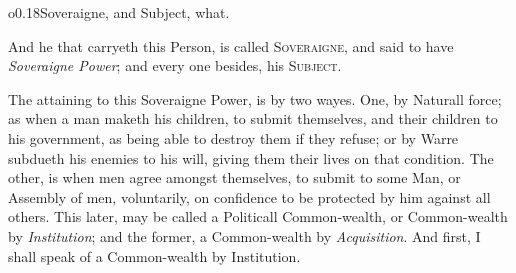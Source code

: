 \begin{wrapfigure}[4]{o}{0.18\textwidth}\wrapadj Soveraigne, and
Subject, what. \end{wrapfigure}

And he that carryeth this Person, is called \textsc{Soveraigne}, and
said to have \textit{Soveraigne Power}; and every one besides, his
\textsc{Subject}.

The attaining to this Soveraigne Power, is by two wayes. One, by
Naturall force; as when a man maketh his children, to submit
themselves, and their children to his government, as being able to
destroy them if they refuse; or by Warre subdueth his enemies to his
will, giving them their lives on that condition. The other, is when
men agree amongst themselves, to submit to some Man, or Assembly of
men, voluntarily, on confidence to be protected by him against all
others. This later, may be called a Politicall Common-wealth, or
Common-wealth by \textit{Institution}; and the former, a Common-wealth
by \textit{Acquisition}. And first, I shall speak of a Common-wealth
by Institution.

